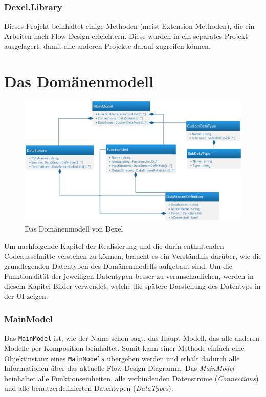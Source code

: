 \subsubsection{Dexel.Library}

Dieses Projekt beinhaltet einige Methoden (meist Extension-Methoden), die ein Arbeiten
nach Flow Design erleichtern. Diese wurden in ein separates Projekt
ausgelagert, damit alle anderen Projekte darauf zugreifen können.

\section{Das Domänenmodell}

	\begin{figure}[H]
		\centering
		\includegraphics[width=1\linewidth]{./img/ModellUml.png} 
		\caption{Das Domänenmodell von Dexel}
	\end{figure}


Um nachfolgende Kapitel der Realisierung und die darin enthaltenden
Codeausschnitte verstehen zu können, braucht es ein Verständnis darüber, wie die
grundlegenden Datentypen des Domänenmodells aufgebaut sind. Um die Funktionalität der
jeweiligen Datentypen besser zu veranschaulichen, werden in diesem Kapitel
Bilder verwendet, welche die spätere Darstellung des Datentyps in der UI zeigen.

\subsubsection{MainModel}

Das \texttt{MainModel} ist, wie der Name schon sagt, das Haupt-Modell, das alle
anderen Modelle per Komposition beinhaltet. Somit kann einer Methode einfach eine Objektinstanz
eines \texttt{MainModels} übergeben werden und erhält dadurch alle Informationen über das aktuelle Flow-Design-Diagramm. 
Das \textit{MainModel} beinhaltet alle Funktionseinheiten, alle verbindenden
Datenströme (\textit{Connections}) und alle benutzerdefinierten Datentypen (\textit{DataTypes}).

